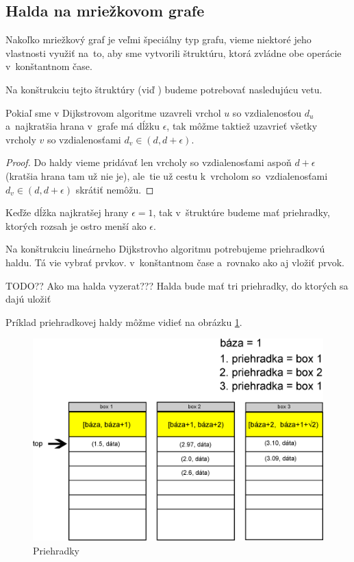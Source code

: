 \subsection{Halda na mriežkovom grafe}
Nakoľko mriežkový graf je veľmi špeciálny typ grafu,
vieme niektoré jeho vlastnosti využiť na~to, aby sme vytvorili štruktúru, ktorá zvládne obe operácie v~konštantnom čase. 


Na konštrukciu tejto štruktúry (viď \cite{gs97}) budeme potrebovať nasledujúcu vetu.

\begin{theorem}
Pokiaľ sme v Dijkstrovom algoritme uzavreli vrchol $u$ so vzdialenosťou $d_u$ a~najkratšia hrana v~grafe má dĺžku $\epsilon$, tak môžme taktiež 
uzavrieť všetky vrcholy $v$ so vzdialenosťami $d_v \in (d, d + \epsilon)$.
\end{theorem}
\begin{proof}
Do haldy vieme pridávať len vrcholy so vzdialenosťami aspoň $d + \epsilon$ (kratšia hrana tam už nie je), 
ale~tie už cestu k~vrcholom so~vzdialenosťami
$d_v \in (d, d + \epsilon)$ skrátiť nemôžu.
\end{proof}


Keďže dĺžka najkratšej hrany $\epsilon = 1$, tak v~štruktúre budeme mať priehradky, ktorých rozsah je ostro menší ako $\epsilon$. 



Na konštrukciu lineárneho Dijkstrovho algoritmu potrebujeme priehradkovú haldu. Tá vie vybrať   prvkov.
v~konštantnom čase a~rovnako ako aj vložiť prvok.

TODO?? Ako ma halda vyzerat???
Halda bude mať tri priehradky, do ktorých sa dajú uložiť 

Príklad priehradkovej haldy môžme vidieť na obrázku 
\ref{fig:priehradky}. 


\begin{figure}[h]
\centering
\includegraphics[width=\textwidth]{./img/priehradky_naplnene_default.eps}
\caption{Priehradky}
\label{fig:priehradky}
\end{figure}


